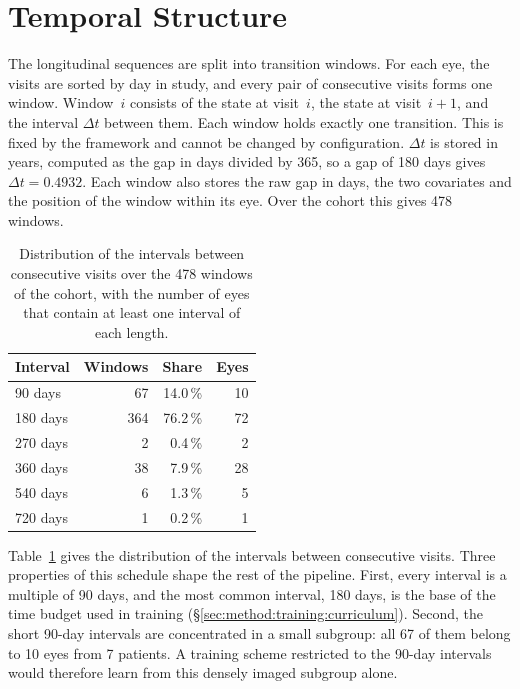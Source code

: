 \section{Temporal Structure}
\label{sec:data:temporal}

The longitudinal sequences are split into transition windows. For each
eye, the visits are sorted by day in study, and every pair of
consecutive visits forms one window. Window~$i$ consists of the state at
visit~$i$, the state at visit~$i+1$, and the interval $\Delta t$ between
them. Each window holds exactly one transition. This is fixed by the
framework and cannot be changed by configuration. $\Delta t$ is
stored in years, computed as the gap in days divided by 365, so a gap of
180 days gives $\Delta t = 0.4932$. Each window also stores the raw gap
in days, the two covariates and the position of the window within its
eye. Over the cohort this gives 478 windows.

\begin{table}[h]
  \centering
  \caption[Distribution of visit intervals.]{%
    Distribution of the intervals between consecutive visits over the
    478 windows of the cohort, with the number of eyes that contain at
    least one interval of each length.}
  \label{tab:data:intervals}
  \begin{tabular}{lrrr}
    \toprule
    Interval & Windows & Share & Eyes \\
    \midrule
    90 days  & 67  & 14.0\,\% & 10 \\
    180 days & 364 & 76.2\,\% & 72 \\
    270 days & 2   & 0.4\,\%  & 2  \\
    360 days & 38  & 7.9\,\%  & 28 \\
    540 days & 6   & 1.3\,\%  & 5  \\
    720 days & 1   & 0.2\,\%  & 1  \\
    \bottomrule
  \end{tabular}
\end{table}

Table~\ref{tab:data:intervals} gives the distribution of the intervals
between consecutive visits. Three properties of this schedule shape the
rest of the pipeline. First, every interval is a multiple of 90 days, and
the most common interval, 180 days, is the base of the time budget used
in training (\S\ref{sec:method:training:curriculum}). Second, the short 90-day intervals are
concentrated in a small subgroup: all 67 of them belong to 10 eyes from
7 patients. A training scheme restricted to the 90-day intervals would therefore learn from this densely imaged subgroup
alone.

